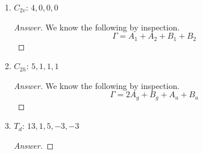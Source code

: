 \documentclass[../psets.tex]{subfiles}
\begin{document}
\begin{enumerate}[label={\Roman*)}]
\begin{enumerate}[label={\alph*)}]
\begin{proof}[Answer]
\begin{align*}
                \hspace{-4em}a_{A_2'}  &= \frac{1}{12}\sum_{R_c}g_c\chi_\Gamma(R_c)\chi_{A_2'}(R_c)  = \frac{1}{12}[(1)(3)(1)+(2)(0)(1)+(3)(-1)(-1)+(1)(-3)(1)+(2)(0)(1)+(3)(1)(-1)] = 0\\
                \hspace{-4em}a_{E'}    &= \frac{1}{12}\sum_{R_c}g_c\chi_\Gamma(R_c)\chi_{E'}(R_c)    = \frac{1}{12}[(1)(3)(2)+(2)(0)(-1)+(3)(-1)(0)+(1)(-3)(2)+(2)(0)(-1)+(3)(1)(0)] = 0\\
                \hspace{-4em}a_{A_1''} &= \frac{1}{12}\sum_{R_c}g_c\chi_\Gamma(R_c)\chi_{A_1''}(R_c) = \frac{1}{12}[(1)(3)(1)+(2)(0)(1)+(3)(-1)(1)+(1)(-3)(-1)+(2)(0)(-1)+(3)(1)(-1)] = 0\\
                \hspace{-4em}a_{A_2''} &= \frac{1}{12}\sum_{R_c}g_c\chi_\Gamma(R_c)\chi_{A_2''}(R_c) = \frac{1}{12}[(1)(3)(1)+(2)(0)(1)+(3)(-1)(-1)+(1)(-3)(-1)+(2)(0)(-1)+(3)(1)(1)] = 1\\
                \hspace{-4em}a_{E''}   &= \frac{1}{12}\sum_{R_c}g_c\chi_\Gamma(R_c)\chi_{E''}(R_c)   = \frac{1}{12}[(1)(3)(2)+(2)(0)(-1)+(3)(-1)(0)+(1)(-3)(-2)+(2)(0)(1)+(3)(1)(0)] = 1
            \end{align*}
            Therefore, we know that
            \begin{equation*}
                \Gamma = A_2''+E''
            \end{equation*}
        \end{proof}
        \item $C_{2v}$: $4,0,0,0$
        \begin{proof}[Answer]
            We know the following by inspection.
            \begin{equation*}
                \Gamma = A_1+A_2+B_1+B_2
            \end{equation*}
        \end{proof}
        \item $C_{2h}$: $5,1,1,1$
        \begin{proof}[Answer]
            We know the following by inspection.
            \begin{equation*}
                \Gamma = 2A_g+B_g+A_u+B_u
            \end{equation*}
        \end{proof}
        \item $T_d$: $13,1,5,-3,-3$
        \begin{proof}[Answer]

\end{proof}
\end{enumerate}
\end{enumerate}
\end{document}
